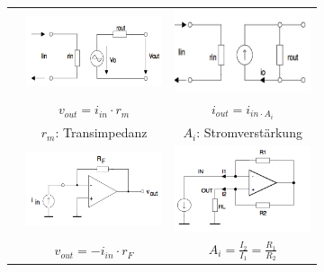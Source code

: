 \begin{tabular}{|c|c|c|}
									& \includegraphics[width=4cm,trim=0 0 0 -5]{./images/ccvs.png}	
									& \includegraphics[width=4cm,trim=0 0 0 -5]{./images/cccs.png}					\\ \cline{2-3}
									& $v_{out}=i_{in} \cdot r_m$			& $i_{out} = i_{in \cdot A_i}$			\\
									& $r_m$: Transimpedanz					& $A_i$: Stromverstärkung				\\ \cline{2-3}
									& \includegraphics[width=4cm,trim=0 0 0 -5]{./images/tia.png}
									& \includegraphics[width=4cm,trim=0 0 0 -5]{./images/cccs-schaltung.png}		\\ 
									& $v_{out}=-i_{in} \cdot r_F$			& $A_i=\frac{I_2}{I_1}=\frac{R_1}{R_2}$	\\ \hline
									
				
			\end{tabular} \\	
			

